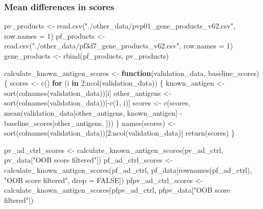 \documentclass[
  11pt,
  oneside]{book}
\newenvironment{Shaded}{\begin{snugshade}}{\end{snugshade}}
\newcommand{\AttributeTok}[1]{\textcolor[rgb]{0.77,0.63,0.00}{#1}}
\newcommand{\ConstantTok}[1]{\textcolor[rgb]{0.00,0.00,0.00}{#1}}
\newcommand{\ControlFlowTok}[1]{\textcolor[rgb]{0.13,0.29,0.53}{\textbf{#1}}}
\newcommand{\DecValTok}[1]{\textcolor[rgb]{0.00,0.00,0.81}{#1}}
\newcommand{\FunctionTok}[1]{\textcolor[rgb]{0.00,0.00,0.00}{#1}}
\newcommand{\NormalTok}[1]{#1}
\newcommand{\OtherTok}[1]{\textcolor[rgb]{0.56,0.35,0.01}{#1}}
\newcommand{\SpecialCharTok}[1]{\textcolor[rgb]{0.00,0.00,0.00}{#1}}
\newcommand{\StringTok}[1]{\textcolor[rgb]{0.31,0.60,0.02}{#1}}
\begin{document}
\hypertarget{mean-differences-in-scores}{%
\subsubsection{Mean differences in scores}\label{mean-differences-in-scores}}

\begin{Shaded}
\begin{Highlighting}[]
\NormalTok{pv\_products }\OtherTok{\textless{}{-}} \FunctionTok{read.csv}\NormalTok{(}\StringTok{"./other\_data/pvp01\_gene\_products\_v62.csv"}\NormalTok{, }\AttributeTok{row.names =} \DecValTok{1}\NormalTok{)}
\NormalTok{pf\_products }\OtherTok{\textless{}{-}} \FunctionTok{read.csv}\NormalTok{(}\StringTok{"./other\_data/pf3d7\_gene\_products\_v62.csv"}\NormalTok{, }\AttributeTok{row.names =} \DecValTok{1}\NormalTok{)}
\NormalTok{gene\_products }\OtherTok{\textless{}{-}} \FunctionTok{rbind}\NormalTok{(pf\_products, pv\_products)}

\NormalTok{calculate\_known\_antigen\_scores }\OtherTok{\textless{}{-}} \ControlFlowTok{function}\NormalTok{(validation\_data, baseline\_scores) \{}
\NormalTok{  scores }\OtherTok{\textless{}{-}} \FunctionTok{c}\NormalTok{()}
  \ControlFlowTok{for}\NormalTok{ (i }\ControlFlowTok{in} \DecValTok{2}\SpecialCharTok{:}\FunctionTok{ncol}\NormalTok{(validation\_data)) \{}
\NormalTok{    known\_antigen }\OtherTok{\textless{}{-}} \FunctionTok{sort}\NormalTok{(}\FunctionTok{colnames}\NormalTok{(validation\_data))[i]}
\NormalTok{    other\_antigens }\OtherTok{\textless{}{-}} \FunctionTok{sort}\NormalTok{(}\FunctionTok{colnames}\NormalTok{(validation\_data))[}\SpecialCharTok{{-}}\FunctionTok{c}\NormalTok{(}\DecValTok{1}\NormalTok{, i)]}
\NormalTok{    scores }\OtherTok{\textless{}{-}} \FunctionTok{c}\NormalTok{(scores, }\FunctionTok{mean}\NormalTok{(validation\_data[other\_antigens, known\_antigen] }\SpecialCharTok{{-}}\NormalTok{ baseline\_scores[other\_antigens, ]))}
\NormalTok{  \}}
  \FunctionTok{names}\NormalTok{(scores) }\OtherTok{\textless{}{-}} \FunctionTok{sort}\NormalTok{(}\FunctionTok{colnames}\NormalTok{(validation\_data))[}\DecValTok{2}\SpecialCharTok{:}\FunctionTok{ncol}\NormalTok{(validation\_data)]}
  \FunctionTok{return}\NormalTok{(scores)}
\NormalTok{\}}

\NormalTok{pv\_ad\_ctrl\_scores }\OtherTok{\textless{}{-}} \FunctionTok{calculate\_known\_antigen\_scores}\NormalTok{(pv\_ad\_ctrl, pv\_data[}\StringTok{"OOB score filtered"}\NormalTok{])}
\NormalTok{pf\_ad\_ctrl\_scores }\OtherTok{\textless{}{-}} \FunctionTok{calculate\_known\_antigen\_scores}\NormalTok{(pf\_ad\_ctrl, pf\_data[}\FunctionTok{rownames}\NormalTok{(pf\_ad\_ctrl), }\StringTok{"OOB score filtered"}\NormalTok{, }\AttributeTok{drop =} \ConstantTok{FALSE}\NormalTok{])}
\NormalTok{pfpv\_ad\_ctrl\_scores }\OtherTok{\textless{}{-}} \FunctionTok{calculate\_known\_antigen\_scores}\NormalTok{(pfpv\_ad\_ctrl, pfpv\_data[}\StringTok{"OOB score filtered"}\NormalTok{])}


\end{Highlighting}
\end{Shaded}
\end{document}
